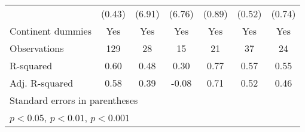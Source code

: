 {\begin{tabular}{l*{6}{c}}
                    &      (0.43)         &      (6.91)         &      (6.76)         &      (0.89)         &      (0.52)         &      (0.74)         \\
\addlinespace
Continent dummies   &         Yes         &         Yes         &         Yes         &         Yes         &         Yes         &         Yes         \\
\midrule
Observations        &         129         &          28         &          15         &          21         &          37         &          24         \\
R-squared           &        0.60         &        0.48         &        0.30         &        0.77         &        0.57         &        0.55         \\
Adj. R-squared      &        0.58         &        0.39         &       -0.08         &        0.71         &        0.52         &        0.46         \\
\bottomrule
\multicolumn{7}{l}{\footnotesize Standard errors in parentheses}\\
\multicolumn{7}{l}{\footnotesize \sym{*} \(p<0.05\), \sym{**} \(p<0.01\), \sym{***} \(p<0.001\)}\\
\end{tabular}
}
